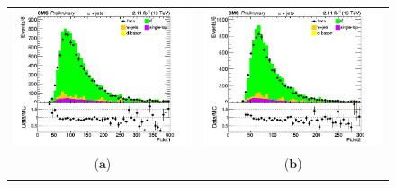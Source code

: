 \documentclass{cmspaper}
\begin{document}
\begin{figure}[htp]
\centering
\begin{tabular}{cc}
\hspace{-0.5cm}
\includegraphics[scale=0.40]{results/PtJet1.png}
& \hspace{-0.5cm} \includegraphics[scale=0.40]{results/PtJet2.png}\\
   ($\mathbf{a}$)\qquad\qquad&($\mathbf{b}$)\qquad\qquad\qquad\\
\hspace{-0.5cm}

\end{tabular}
\end{figure}
\end{document}
